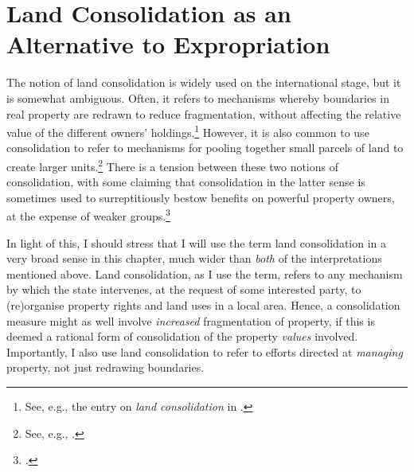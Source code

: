 \section{Land Consolidation as an Alternative to Expropriation}\label{sec:6:2}

The notion of land consolidation is widely used on the international stage, but it is somewhat ambiguous. Often, it refers to mechanisms whereby boundaries in real property are redrawn to reduce fragmentation, without affecting the relative value of the different owners' holdings.\footnote{See, e.g., the entry on {\it land consolidation} in \cite{mayhew09}.} However, it is also common to use consolidation to refer to mechanisms for pooling together small parcels of land to create larger units.\footnote{See, e.g., \cite{lerman06}.} There is a tension between these two notions of consolidation, with some claiming that consolidation in the latter sense is sometimes used to surreptitiously bestow benefits on powerful property owners, at the expense of weaker groups.\footcite[237-239]{lipton09}

In light of this, I should stress that I will use the term land consolidation in a very broad sense in this chapter, much wider than {\it both} of the interpretations mentioned above. Land consolidation, as I use the term, refers to any mechanism by which the state intervenes, at the request of some interested party, to (re)organise property rights and land uses in a local area. Hence, a consolidation measure might as well involve {\it increased} fragmentation of property, if this is deemed a rational form of consolidation of the property {\it values} involved. Importantly, I also use land consolidation to refer to efforts directed at {\it managing} property, not just redrawing boundaries.


